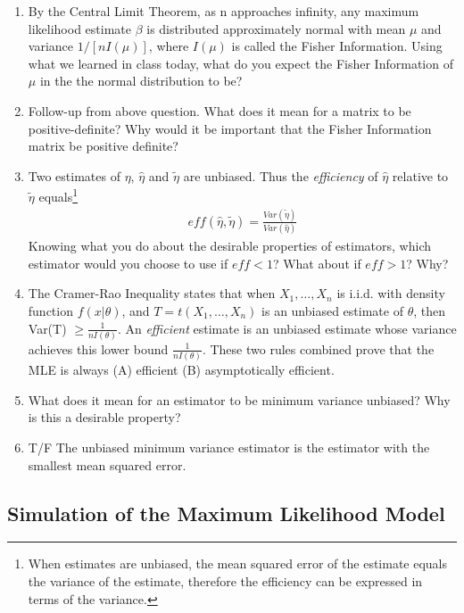 \documentclass[11pt]{article}
\begin{document}
\begin{enumerate}
 \item By the Central Limit Theorem, as n approaches infinity, any maximum likelihood estimate $\beta$ is distributed approximately normal with mean $\mu$ and variance $1/[nI(\mu)]$, where $I(\mu)$ is called the Fisher Information.  Using what we learned in class today, what do you expect the Fisher Information of $\mu$ in the the normal distribution to be? 
 
 \item Follow-up from above question.  What does it mean for a matrix to be positive-definite?  Why would it be important that the Fisher Information matrix be positive definite? 
 
 \item Two estimates of $\eta$, $\hat{\eta}$ and $\tilde{\eta}$ are unbiased. Thus the \emph{efficiency} of $\hat{\eta}$ relative to $\tilde{\eta}$ equals\footnote[1]{ When estimates are unbiased, the mean squared error of the estimate equals the variance of the estimate, therefore the efficiency can be expressed in terms of the variance.}
\begin{eqnarray*}
eff(\hat{\eta}, \tilde{\eta}) = \frac{Var(\tilde{\eta})}{Var(\hat{\eta})}
\end{eqnarray*}
Knowing what you do about the desirable properties of estimators, which estimator would you choose to use if $eff < 1$?  What about if $eff >1$? Why?
\item The Cramer-Rao Inequality states that when $X_1,\ldots,X_n$ is i.i.d. with density function $f(x|\theta)$, and $T=t(X_1,\ldots,X_n)$ is an unbiased estimate of $ \theta$, then Var(T) $\geq \frac{1}{nI(\theta)}.$ An \emph{efficient} estimate is an unbiased estimate whose variance achieves this lower bound $\frac{1}{nI(\theta)}$.  These two rules combined prove that the MLE is always (A) efficient (B) asymptotically efficient.  
 
 \item What does it mean for an estimator to be minimum variance unbiased?  Why is this a desirable property? 
 
 \item T/F The unbiased minimum variance estimator is the estimator with the smallest mean squared error.   
\end{enumerate}

\subsection{Simulation of the Maximum Likelihood Model}
\end{document}
